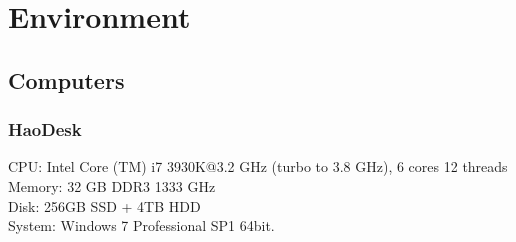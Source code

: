 \section{Environment}
\subsection{Computers}
\subsubsection{HaoDesk}
\label{HaoDesk}

CPU: Intel Core (TM) i7 3930K@3.2 GHz (turbo to 3.8 GHz), 6 cores 12 threads\\
Memory: 32 GB DDR3 1333 GHz\\
Disk: 256GB SSD + 4TB HDD\\
System:  Windows 7 Professional SP1 64bit.
